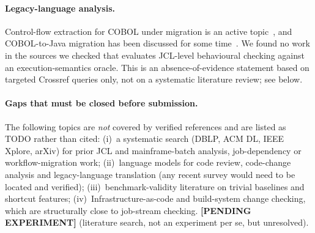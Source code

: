 \paragraph{Legacy-language analysis.}
Control-flow extraction for COBOL under migration is an active
topic~\cite{deknop2022semiparsing}, and COBOL-to-Java migration has been
discussed for some time~\cite{sneed2010migrating}. We found no work in the
sources we checked that evaluates JCL-level behavioural checking against an
execution-semantics oracle. This is an absence-of-evidence statement based on
targeted Crossref queries only, not on a systematic literature review; see
below.

\paragraph{Gaps that must be closed before submission.}
The following topics are \emph{not} covered by verified references and are
listed as TODO rather than cited:
(i)~a systematic search (DBLP, ACM DL, IEEE Xplore, arXiv) for prior JCL and
mainframe-batch analysis, job-dependency or workflow-migration work;
(ii)~language models for code review, code-change analysis and legacy-language
translation (any recent survey would need to be located and verified);
(iii)~benchmark-validity literature on trivial baselines and shortcut features;
(iv)~Infrastructure-as-code and build-system change checking, which are
structurally close to job-stream checking.
\textbf{[PENDING EXPERIMENT]} (literature search, not an experiment per se, but
unresolved).
